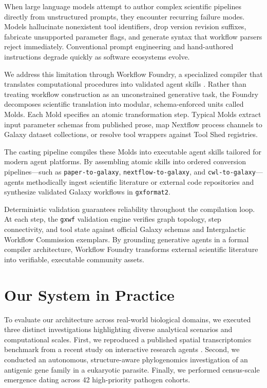 \documentclass[11pt,letterpaper]{article}
\begin{document}
When large language models attempt to author complex scientific pipelines directly from unstructured prompts, they encounter recurring failure modes. Models hallucinate nonexistent tool identifiers, drop version revision suffixes, fabricate unsupported parameter flags, and generate syntax that workflow parsers reject immediately. Conventional prompt engineering and hand-authored instructions degrade quickly as software ecosystems evolve.

We address this limitation through Workflow Foundry, a specialized compiler that translates computational procedures into validated agent skills \cite{foundry2026}. Rather than treating workflow construction as an unconstrained generative task, the Foundry decomposes scientific translation into modular, schema-enforced units called Molds. Each Mold specifies an atomic transformation step. Typical Molds extract input parameter schemas from published prose, map Nextflow process channels to Galaxy dataset collections, or resolve tool wrappers against Tool Shed registries.

The casting pipeline compiles these Molds into executable agent skills tailored for modern agent platforms. By assembling atomic skills into ordered conversion pipelines---such as \texttt{paper-to-galaxy}, \texttt{nextflow-to-galaxy}, and \texttt{cwl-to-galaxy}---agents methodically ingest scientific literature or external code repositories and synthesize validated Galaxy workflows in \texttt{gxformat2}.

Deterministic validation guarantees reliability throughout the compilation loop. At each step, the \texttt{gxwf} validation engine verifies graph topology, step connectivity, and tool state against official Galaxy schemas and Intergalactic Workflow Commission exemplars. By grounding generative agents in a formal compiler architecture, Workflow Foundry transforms external scientific literature into verifiable, executable community assets. 

\section{Our System in Practice}

To evaluate our architecture across real-world biological domains, we executed three distinct investigations highlighting diverse analytical scenarios and computational scales. First, we reproduced a published spatial transcriptomics benchmark from a recent study on interactive research agents \cite{miao2026}. Second, we conducted an autonomous, structure-aware phylogenomics investigation of an antigenic gene family in a eukaryotic parasite. Finally, we performed census-scale emergence dating across 42 high-priority pathogen cohorts.
\end{document}
